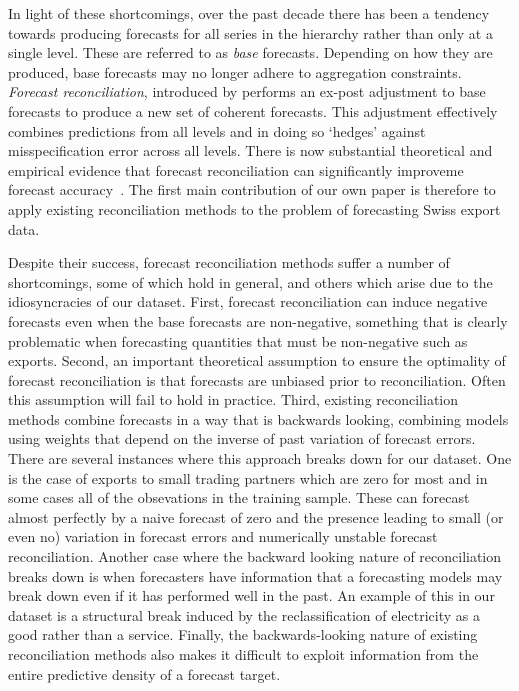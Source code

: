\documentclass[a4paper,fleqn,11pt]{article}
\begin{document}
In light of these shortcomings, over the past decade there has been a tendency towards producing forecasts for all series in the hierarchy rather than only at a single level.  These are referred to as {\em base} forecasts.  Depending on how they are produced, base forecasts may no longer adhere to aggregation constraints.  {\em Forecast reconciliation}, introduced by \cite{Hyndman2011} performs an ex-post adjustment to base forecasts to produce a new set of coherent forecasts. This adjustment effectively combines predictions from all levels and in doing so `hedges' against misspecification error across all levels.  There is now substantial theoretical and empirical evidence that forecast reconciliation can significantly improveme forecast accuracy~\citep[see][and references therein]{Wickramasuriya2015}. The first main contribution of our own paper is therefore to apply existing reconciliation methods to the problem of forecasting Swiss export data.

Despite their success, forecast reconciliation methods suffer a number of shortcomings, some of which hold in general, and others which arise due to the idiosyncracies of our dataset.  First, forecast reconciliation can induce negative forecasts even when the base forecasts are non-negative, something that is clearly problematic when forecasting quantities that must be non-negative such as exports.   Second, an important theoretical assumption to ensure the optimality of forecast reconciliation is that forecasts are unbiased prior to reconciliation.  Often this assumption will fail to hold in practice.  Third, existing reconciliation methods combine forecasts in a way that is backwards looking, combining models using weights that depend on the inverse of past variation of forecast errors.  There are several instances where this approach breaks down for our dataset.  One is the case of exports to small trading partners which are zero for most and in some cases all of the obsevations in the training sample.  These can forecast almost perfectly by a naive forecast of zero and the presence leading to small (or even no) variation in forecast errors and numerically unstable forecast reconciliation.  Another case where the backward looking nature of reconciliation breaks down is when forecasters have information that a forecasting models may break down even if it has performed well in the past. An example of this in our dataset is a structural break induced by the reclassification of electricity as a good rather than a service.  Finally, the backwards-looking nature of existing reconciliation methods also makes it difficult to exploit information from the entire predictive density of a forecast target.\\
\end{document}

